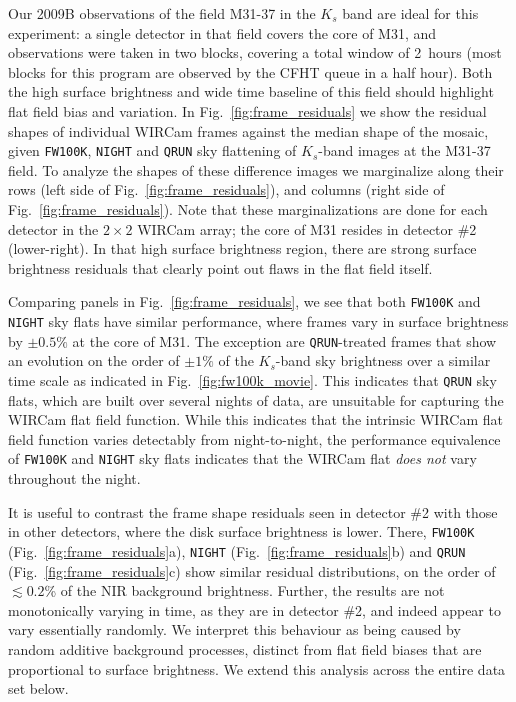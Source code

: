 \documentclass[iop,tighten]{emulateapj}
\newcommand{\Fig}[1]{Fig.~\ref{fig:#1}}  %
\begin{document}
Our 2009B observations of the field M31-37 in the $K_s$ band are ideal for this experiment: a single detector in that field covers the core of M31, and observations were taken in two blocks, covering a total window of 2~hours (most blocks for this program are observed by the CFHT queue in a half hour).
Both the high surface brightness and wide time baseline of this field should highlight flat field bias and variation.
In \Fig{frame_residuals} we show the residual shapes of individual WIRCam frames against the median shape of the mosaic, given \texttt{FW100K}, \texttt{NIGHT} and \texttt{QRUN} sky flattening of $K_s$-band images at the M31-37 field.
To analyze the shapes of these difference images we marginalize along their rows (left side of \Fig{frame_residuals}), and columns (right side of \Fig{frame_residuals}).
Note that these marginalizations are done for each detector in the $2\times2$ WIRCam array; the core of M31 resides in detector \#2 (lower-right).
In that high surface brightness region, there are strong surface brightness residuals that clearly point out flaws in the flat field itself.

Comparing panels in \Fig{frame_residuals}, we see that both \texttt{FW100K} and \texttt{NIGHT} sky flats have similar performance, where frames vary in surface brightness by $\pm 0.5\%$ at the core of M31.
The exception are \texttt{QRUN}-treated frames that show an evolution on the order of $\pm 1\%$ of the $K_s$-band sky brightness over a similar time scale as indicated in \Fig{fw100k_movie}.
This indicates that \texttt{QRUN} sky flats, which are built over several nights of data, are unsuitable for capturing the WIRCam flat field function.
While this indicates that the intrinsic WIRCam flat field function varies detectably from night-to-night, the performance equivalence of \texttt{FW100K} and \texttt{NIGHT} sky flats indicates that the WIRCam flat \emph{does not} vary throughout the night.

It is useful to contrast the frame shape residuals seen in detector \#2 with those in other detectors, where the disk surface brightness is lower.
There, \texttt{FW100K} (\Fig{frame_residuals}a), \texttt{NIGHT} (\Fig{frame_residuals}b) and \texttt{QRUN} (\Fig{frame_residuals}c) show similar residual distributions, on the order of $\lesssim 0.2$\% of the NIR background brightness.
Further, the results are not monotonically varying in time, as they are in detector \#2, and indeed appear to vary essentially randomly.
We interpret this behaviour as being caused by random additive background processes, distinct from flat field biases that are proportional to surface brightness.
We extend this analysis across the entire data set below.
\end{document}
